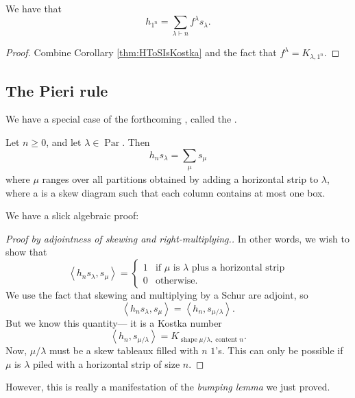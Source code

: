 \documentclass{article}
\newcommand{\InnerProduct}[1]{
    \ensuremath{
        \left\langle
            {#1}
        \right\rangle
    }
}
\DeclareMathOperator{\shape}{shape}
\DeclareMathOperator{\content}{content}
\DeclareMathOperator{\Par}{Par}
\begin{document}
\begin{corollary}
    We have that
    \[
        h_{1^n} = \sum_{\lambda \vdash n} f^\lambda s_\lambda.
    \]
\end{corollary}

\begin{proof}
    Combine Corollary \ref{thm:HToSIsKostka} and the fact that $f^\lambda = K_{\lambda,1^n}$.
\end{proof}

\subsection{The Pieri rule}

We have a special case of the forthcoming , called the .

\begin{theorem}
    Let $n \geq 0$, and let $\lambda \in \Par$.
    Then
    \[
        h_ns_\lambda = \sum_{\substack{\mu}} s_\mu
    \]
    where $\mu$ ranges over all partitions obtained by adding a horizontal strip to $\lambda$, where a  is a skew diagram such that each column contains at most one box.
\end{theorem}

We have a slick algebraic proof:

\begin{proof}
    [Proof by adjointness of skewing and right-multiplying.]
    In other words, we wish to show that
    \[
        \InnerProduct{h_ns_\lambda,s_\mu}
        =
        \begin{cases}
            1 & \text{if $\mu$ is $\lambda$ plus a horizontal strip} \\
            0 & \text{otherwise}.
        \end{cases}
    \]
    We use the fact that skewing and multiplying by a Schur are adjoint, so
    \[
        \InnerProduct{h_ns_\lambda,s_\mu}
        =
        \InnerProduct{h_n,s_{\mu/\lambda}}.
    \]
    But we know this quantity--- it is a Kostka number
    \[
        \InnerProduct{h_n,s_{\mu/\lambda}}
        =
        K_{\shape \mu/\lambda, \content n}.
    \]
    Now, $\mu / \lambda$ must be a skew tableaux filled with $n$ $1$'s.
    This can only be possible if $\mu$ is $\lambda$ piled with a horizontal strip of size $n$.
\end{proof}

However, this is really a manifestation of the \textit{bumping lemma} we just proved.
\end{document}
